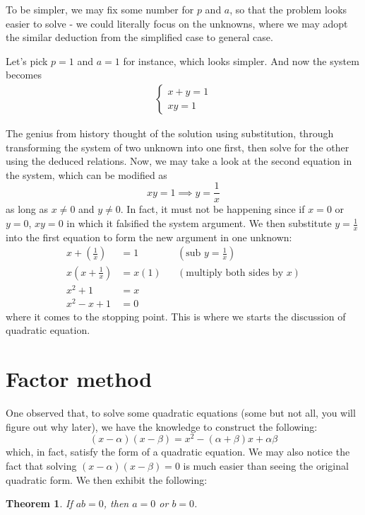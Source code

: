\documentclass[12pt]{article}
\newtheorem{theorem}[definition]{Theorem}
\begin{document}
    To be simpler, we may fix some number for $p$ and $a$, so that the problem looks easier to solve - we could literally focus on the unknowns, where we may adopt the similar deduction from the simplified case to general case.

    Let's pick $p=1$ and $a=1$ for instance, which looks simpler. And now the system becomes
    \begin{align*}
        \begin{cases}
            x+y=1\\xy=1
        \end{cases}
    \end{align*}

    The genius from history thought of the solution using substitution, through transforming the system of two unknown into one first, then solve for the other using the deduced relations. Now, we may take a look at the second equation in the system, which can be modified as $$xy=1\implies y=\frac{1}{x}$$ as long as $x\neq0$ and $y\neq0$. In fact, it must not be happening since if $x=0$ or $y=0$, $xy=0$ in which it falsified the system argument. We then substitute $y=\frac{1}{x}$ into the first equation to form the new argument in one unknown:
    \begin{align*}
        x+(\frac{1}{x})&=1&&(\textrm{sub }y=\frac{1}{x})\\
        x(x+\frac{1}{x})&=x(1)&&(\textrm{multiply both sides by }x)\\
        x^2+1&=x\\
        x^2-x+1&=0
    \end{align*}
    where it comes to the stopping point. This is where we starts the discussion of quadratic equation.

    \section*{Factor method}
    One observed that, to solve some quadratic equations (some but not all, you will figure out why later), we have the knowledge to construct the following: $$(x-\alpha)(x-\beta)=x^2-(\alpha+\beta)x+\alpha\beta$$ which, in fact, satisfy the form of a quadratic equation. We may also notice the fact that solving $(x-\alpha)(x-\beta)=0$ is much easier than seeing the original quadratic form. We then exhibit the following:
    \begin{theorem}
        If $ab=0$, then $a=0$ or $b=0$.
    \end{theorem}
\end{document}
